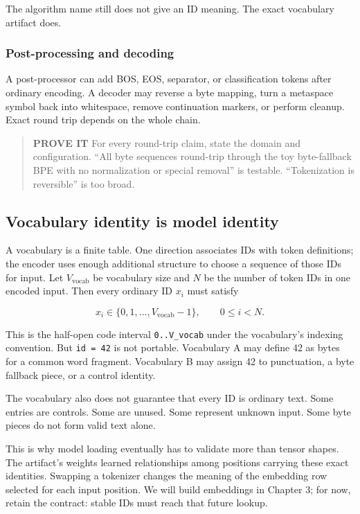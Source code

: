 \documentclass[
  10pt,
]{article}
\begin{document}
The algorithm name still does not give an ID meaning. The exact
vocabulary artifact does.

\subsubsection{Post-processing and
decoding}\label{post-processing-and-decoding}

A post-processor can add BOS, EOS, separator, or classification tokens
after ordinary encoding. A decoder may reverse a byte mapping, turn a
metaspace symbol back into whitespace, remove continuation markers, or
perform cleanup. Exact round trip depends on the whole chain.

\begin{quote}
\textbf{PROVE IT} For every round-trip claim, state the domain and
configuration. ``All byte sequences round-trip through the toy
byte-fallback BPE with no normalization or special removal'' is
testable. ``Tokenization is reversible'' is too broad.
\end{quote}

\subsection{Vocabulary identity is model
identity}\label{vocabulary-identity-is-model-identity}

A vocabulary is a finite table. One direction associates IDs with token
definitions; the encoder uses enough additional structure to choose a
sequence of those IDs for input. Let \(V_{\mathrm{vocab}}\) be
vocabulary size and \(N\) be the number of token IDs in one encoded
input. Then every ordinary ID \(x_i\) must satisfy

\[
x_i\in\{0,1,\ldots,V_{\mathrm{vocab}}-1\},
\qquad 0\le i<N.
\]

This is the half-open code interval \texttt{0..V\_vocab} under the
vocabulary's indexing convention. But \texttt{id\ =\ 42} is not
portable. Vocabulary A may define 42 as bytes for a common word
fragment. Vocabulary B may assign 42 to punctuation, a byte fallback
piece, or a control identity.

The vocabulary also does not guarantee that every ID is ordinary text.
Some entries are controls. Some are unused. Some represent unknown
input. Some byte pieces do not form valid text alone.

This is why model loading eventually has to validate more than tensor
shapes. The artifact's weights learned relationships among positions
carrying these exact identities. Swapping a tokenizer changes the
meaning of the embedding row selected for each input position. We will
build embeddings in Chapter 3; for now, retain the contract: stable IDs
must reach that future lookup.
\end{document}
